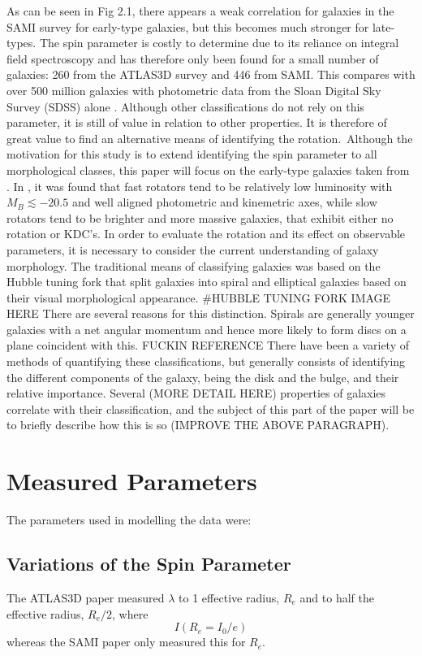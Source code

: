As can be seen in Fig 2.1, there appears a weak correlation for galaxies in the SAMI survey for early-type galaxies, but this becomes much stronger for late-types.
The spin parameter is costly to determine due to its reliance on integral field spectroscopy and has therefore only been found for a small number of galaxies: 260 from the ATLAS3D survey and 446 from SAMI. This compares with over 500 million galaxies with photometric data from the Sloan Digital Sky Survey (SDSS) alone \cite{SDSS}. Although other classifications do not rely on this parameter, it is still of value in relation to other properties. It is therefore of great value to find an alternative means of identifying the rotation.\
Although the motivation for this study is to extend identifying the spin parameter to all morphological classes, this paper will focus on the early-type galaxies taken from \cite{Emsellem2011}.
In \cite{Emsellem2008}, it was found that fast rotators tend to be relatively low luminosity with $M_{B}\lesssim-20.5$ and well aligned photometric and kinemetric axes, while slow rotators tend to be brighter and more massive galaxies, that exhibit either no rotation or KDC's.
In order to evaluate the rotation and its effect on observable parameters, it is necessary to consider the current understanding of galaxy morphology. The traditional means of classifying galaxies was based on the Hubble tuning fork that split galaxies into spiral and elliptical galaxies based on their visual morphological appearance.
#HUBBLE TUNING FORK IMAGE HERE
There are several reasons for this distinction. Spirals are generally younger galaxies with a net angular momentum and hence more likely to form discs on a plane coincident with this. FUCKIN REFERENCE
There have been a variety of methods of quantifying these classifications, but generally consists of identifying the different components of the galaxy, being the disk and the bulge, and their relative importance.  Several (MORE DETAIL HERE) properties of galaxies correlate with their classification, and the subject of this part of the paper will be to briefly describe how this is so (IMPROVE THE ABOVE PARAGRAPH).
\section{Measured Parameters}
The parameters used in modelling the data were:
\subsection{Variations of the Spin Parameter}
The ATLAS3D paper measured $\lambda$ to 1 effective radius, $R_{e}$ and to half the effective radius, $R_{e}/2$, where 
\begin{equation}
I(R_{e}=I_{0}/e)
\end{equation}
whereas the SAMI paper only measured this for $R_{e}$\cite[p.~3]{Cortese2016}. 
